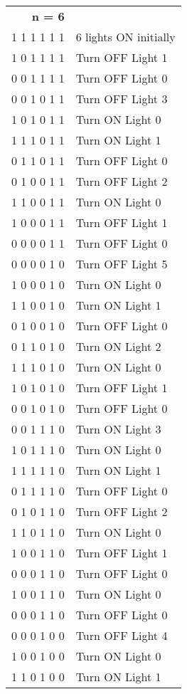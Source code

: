 \documentclass[12pt, a4paper, twoside]{article}
\begin{document}
\begin{enumerate}
\begin{enumerate}[leftmargin=0cm,itemindent=.5cm,labelwidth=\itemindent,labelsep=.2cm,align=left]
  \begin{tabular}{rl}
    \textbf{n = 6}\\
    1 1 1 1 1 1& 	 6 lights ON initially\\
    1 0 1 1 1 1& 	 Turn OFF Light 1\\
    0 0 1 1 1 1& 	 Turn OFF Light 0\\
    0 0 1 0 1 1& 	 Turn OFF Light 3\\
    1 0 1 0 1 1& 	 Turn ON Light 0\\
    1 1 1 0 1 1& 	 Turn ON Light 1\\
    0 1 1 0 1 1& 	 Turn OFF Light 0\\
    0 1 0 0 1 1& 	 Turn OFF Light 2\\
    1 1 0 0 1 1& 	 Turn ON Light 0\\
    1 0 0 0 1 1& 	 Turn OFF Light 1\\
    0 0 0 0 1 1& 	 Turn OFF Light 0\\
    0 0 0 0 1 0& 	 Turn OFF Light 5\\
    1 0 0 0 1 0& 	 Turn ON Light 0\\
    1 1 0 0 1 0& 	 Turn ON Light 1\\
    0 1 0 0 1 0& 	 Turn OFF Light 0\\
    0 1 1 0 1 0& 	 Turn ON Light 2\\
    1 1 1 0 1 0& 	 Turn ON Light 0\\
    1 0 1 0 1 0& 	 Turn OFF Light 1\\
    0 0 1 0 1 0& 	 Turn OFF Light 0\\
    0 0 1 1 1 0& 	 Turn ON Light 3\\
    1 0 1 1 1 0& 	 Turn ON Light 0\\
    1 1 1 1 1 0& 	 Turn ON Light 1\\
    0 1 1 1 1 0& 	 Turn OFF Light 0\\
    0 1 0 1 1 0& 	 Turn OFF Light 2\\
    1 1 0 1 1 0& 	 Turn ON Light 0\\
    1 0 0 1 1 0& 	 Turn OFF Light 1\\
    0 0 0 1 1 0& 	 Turn OFF Light 0\\
    1 0 0 1 1 0& 	 Turn ON Light 0\\
    0 0 0 1 1 0& 	 Turn OFF Light 0\\
    0 0 0 1 0 0& 	 Turn OFF Light 4\\
    1 0 0 1 0 0& 	 Turn ON Light 0\\
    1 1 0 1 0 0& 	 Turn ON Light 1\\

\end{tabular}
\end{enumerate}
\end{enumerate}
\end{document}
